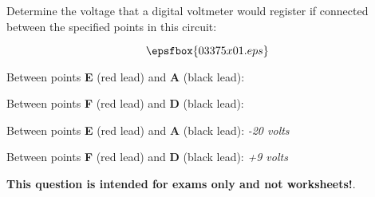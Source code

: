

Determine the voltage that a digital voltmeter would register if connected between the specified points in this circuit:

$$\epsfbox{03375x01.eps}$$

Between points {\bf E} (red lead) and {\bf A} (black lead):

\vskip 10pt

Between points {\bf F} (red lead) and {\bf D} (black lead):







Between points {\bf E} (red lead) and {\bf A} (black lead): {\it -20 volts}

\vskip 10pt

Between points {\bf F} (red lead) and {\bf D} (black lead): {\it +9 volts}







{\bf This question is intended for exams only and not worksheets!}.



